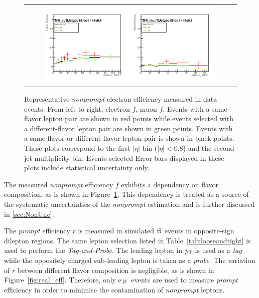 \begin{figure}[tbh!]
 \begin{center}
 \begin{tabular}{c}
 \includegraphics[width=0.85\textwidth]{figures/Part3/Nonprompt/MR/fake_eff}
 \end{tabular}
 \caption{Representative \emph{nonprompt} electron efficiency measured in data events. From left to right: electron $f$, muon $f$. Events with a same-flavor lepton pair are shown in red points while events selected with a different-flavor lepton pair are shown in green points. Events with a same-flavor or different-flavor lepton pair is shown in black points. These plots correspond to the first $|\eta|$ bin ($|\eta|<$0.8) and the second jet multiplicity bin. Events selected Error bars displayed in these plots include statistical uncertainty only. }
 \label{fig:fake_eff}
 \end{center}
\end{figure}

The measured \emph{nonprompt} efficiency $f$ exhibits a dependency on flavor composition, as is shown in Figure~\ref{fig:fake_eff}. This dependency is treated as a source of the systematic uncertainties of the \emph{nonprompt} estimation and is further discussed in \autoref{sec:NonUnc}.

The \emph{prompt} efficiency $r$ is measured in simulated $\textsf{t}\overline{\textsf{t}}$ events in opposite-sign dilepton regions. The same lepton selection listed in Table~\ref{tab:looseandtight} is used to perform the \emph{Tag-and-Probe}. The leading lepton in $p_{\textsf{T}}$ is used as a \emph{tag} while the oppositely charged sub-leading lepton is taken as a \emph{probe}. The variation of $r$ between different flavor composition is negligible, as is shown in Figure~\ref{fig:real_eff}. Therefore, only e$\upmu$ events are used to measure \emph{prompt} efficiency in order to minimise the contamination of \emph{nonprompt} leptons.

